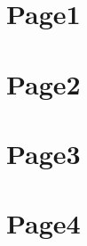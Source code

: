\documentclass[]{ctexart}
\begin{document}
    \section{Page1} \lipsum[1-1] \newpage
    \section{Page2} \lipsum[2-2] \newpage
    \section{Page3} \lipsum[3-3] \newpage
    \section{Page4} \lipsum[4-4] \newpage
\end{document}
